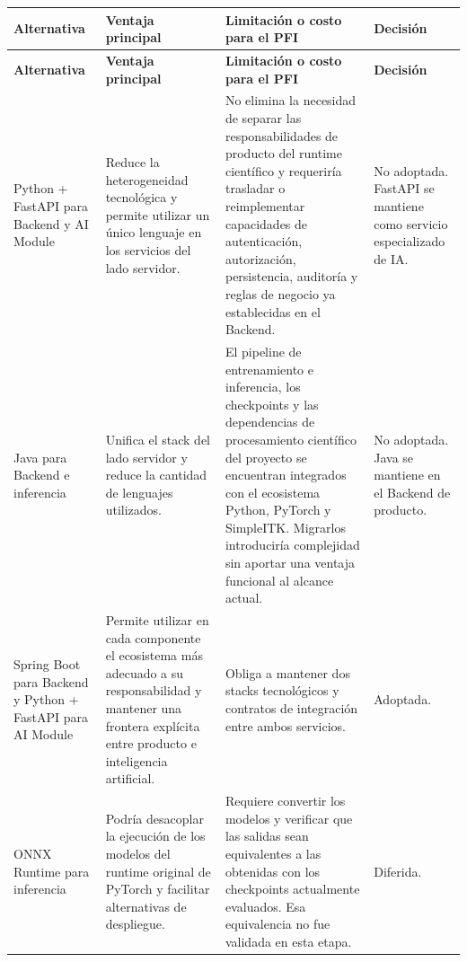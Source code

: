 {\scriptsize
\setlength{\LTleft}{0pt}
\setlength{\LTright}{0pt}
\setlength{\tabcolsep}{2pt}
\renewcommand{\arraystretch}{1.18}
\label{tab:arch-alternativas}
\begin{longtable}{>{\raggedright\arraybackslash}p{} >{\raggedright\arraybackslash}p{} >{\raggedright\arraybackslash}p{} >{\raggedright\arraybackslash}p{}}
\hline
\textbf{Alternativa} & \textbf{Ventaja principal} & \textbf{Limitación o costo para el PFI} & \textbf{Decisión} \\
\hline
\endfirsthead
\hline
\textbf{Alternativa} & \textbf{Ventaja principal} & \textbf{Limitación o costo para el PFI} & \textbf{Decisión} \\
\hline
\endhead
\hline
\endfoot
Python + FastAPI para Backend y AI Module & Reduce la heterogeneidad tecnológica y permite utilizar un único lenguaje en los servicios del lado servidor. & No elimina la necesidad de separar las responsabilidades de producto del runtime científico y requeriría trasladar o reimplementar capacidades de autenticación, autorización, persistencia, auditoría y reglas de negocio ya establecidas en el Backend. & No adoptada. FastAPI se mantiene como servicio especializado de IA. \\
Java para Backend e inferencia & Unifica el stack del lado servidor y reduce la cantidad de lenguajes utilizados. & El pipeline de entrenamiento e inferencia, los checkpoints y las dependencias de procesamiento científico del proyecto se encuentran integrados con el ecosistema Python, PyTorch y SimpleITK. Migrarlos introduciría complejidad sin aportar una ventaja funcional al alcance actual. & No adoptada. Java se mantiene en el Backend de producto. \\
Spring Boot para Backend y Python + FastAPI para AI Module & Permite utilizar en cada componente el ecosistema más adecuado a su responsabilidad y mantener una frontera explícita entre producto e inteligencia artificial. & Obliga a mantener dos stacks tecnológicos y contratos de integración entre ambos servicios. & Adoptada. \\
ONNX Runtime para inferencia & Podría desacoplar la ejecución de los modelos del runtime original de PyTorch y facilitar alternativas de despliegue. & Requiere convertir los modelos y verificar que las salidas sean equivalentes a las obtenidas con los checkpoints actualmente evaluados. Esa equivalencia no fue validada en esta etapa. & Diferida. \\
\hline
\end{longtable}
}


